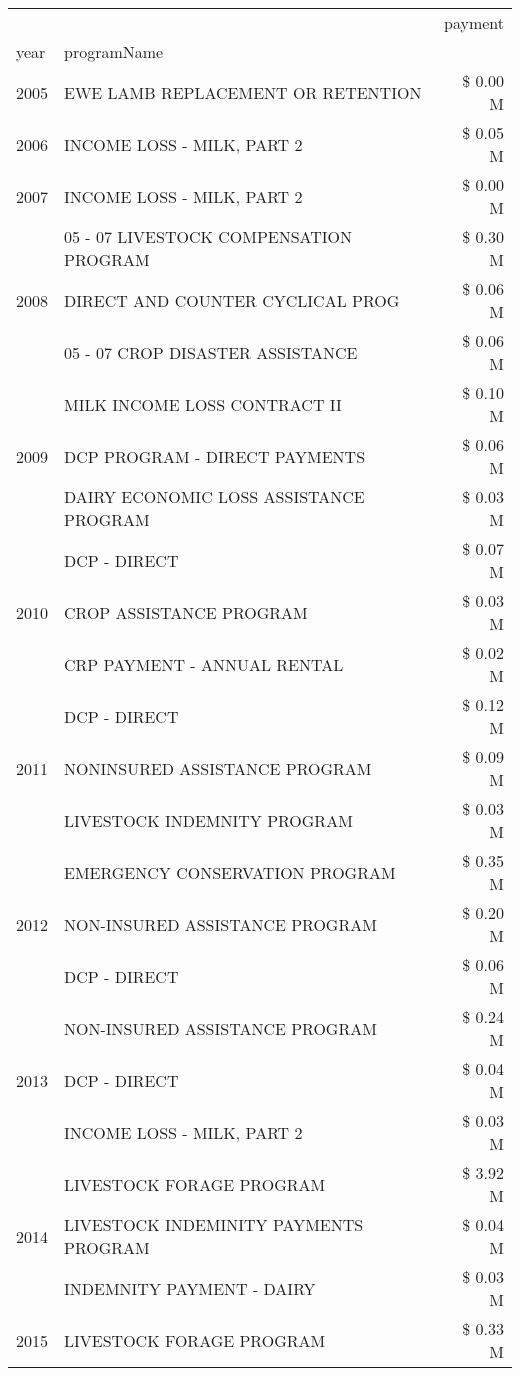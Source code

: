 \begin{tabular}{llr}
\toprule
 &  & payment \\
year & programName &  \\
\midrule
2005 & EWE LAMB REPLACEMENT OR RETENTION & \$ 0.00 M \\
\cline{1-3}
2006 & INCOME LOSS - MILK, PART 2 & \$ 0.05 M \\
\cline{1-3}
2007 & INCOME LOSS - MILK, PART 2 & \$ 0.00 M \\
\cline{1-3}
\multirow[t]{3}{*}{2008} & 05 - 07 LIVESTOCK COMPENSATION PROGRAM & \$ 0.30 M \\
 & DIRECT AND COUNTER CYCLICAL PROG & \$ 0.06 M \\
 & 05 - 07 CROP DISASTER ASSISTANCE & \$ 0.06 M \\
\cline{1-3}
\multirow[t]{3}{*}{2009} & MILK INCOME LOSS CONTRACT II & \$ 0.10 M \\
 & DCP PROGRAM - DIRECT PAYMENTS & \$ 0.06 M \\
 & DAIRY ECONOMIC LOSS ASSISTANCE PROGRAM & \$ 0.03 M \\
\cline{1-3}
\multirow[t]{3}{*}{2010} & DCP - DIRECT & \$ 0.07 M \\
 & CROP ASSISTANCE PROGRAM & \$ 0.03 M \\
 & CRP PAYMENT - ANNUAL RENTAL & \$ 0.02 M \\
\cline{1-3}
\multirow[t]{3}{*}{2011} & DCP - DIRECT & \$ 0.12 M \\
 & NONINSURED ASSISTANCE PROGRAM & \$ 0.09 M \\
 & LIVESTOCK INDEMNITY PROGRAM & \$ 0.03 M \\
\cline{1-3}
\multirow[t]{3}{*}{2012} & EMERGENCY CONSERVATION PROGRAM & \$ 0.35 M \\
 & NON-INSURED ASSISTANCE PROGRAM & \$ 0.20 M \\
 & DCP - DIRECT & \$ 0.06 M \\
\cline{1-3}
\multirow[t]{3}{*}{2013} & NON-INSURED ASSISTANCE PROGRAM & \$ 0.24 M \\
 & DCP - DIRECT & \$ 0.04 M \\
 & INCOME LOSS - MILK, PART 2 & \$ 0.03 M \\
\cline{1-3}
\multirow[t]{3}{*}{2014} & LIVESTOCK FORAGE PROGRAM & \$ 3.92 M \\
 & LIVESTOCK INDEMINITY PAYMENTS PROGRAM & \$ 0.04 M \\
 & INDEMNITY PAYMENT - DAIRY & \$ 0.03 M \\
\cline{1-3}
\multirow[t]{3}{*}{2015} & LIVESTOCK FORAGE PROGRAM & \$ 0.33 M \\

\end{tabular}
